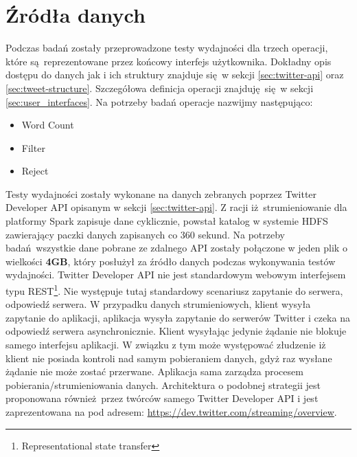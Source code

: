 \section{Źródła danych}
Podczas badań zostały przeprowadzone testy wydajności dla trzech operacji, które są reprezentowane przez końcowy interfejs użytkownika. Dokładny opis dostępu do danych jak i ich struktury znajduje się w sekcji \ref{sec:twitter-api} oraz \ref{sec:tweet-structure}. Szczegółowa definicja operacji znajduję się w sekcji \ref{sec:user_interfaces}. 
Na potrzeby badań operacje nazwijmy następująco:
\begin{itemize}
	\item {Word Count}
	\item {Filter}
	\item {Reject}
\end{itemize}
Testy wydajności zostały wykonane na danych zebranych poprzez Twitter Developer API opisanym w sekcji \ref{sec:twitter-api}. Z racji iż strumieniowanie dla platformy Spark zapisuje dane cyklicznie, powstał katalog w systemie HDFS zawierający paczki danych zapisanych co 360 sekund. Na potrzeby badań wszystkie dane pobrane ze zdalnego API zostały połączone w jeden plik o wielkości \textbf{4GB}, który posłużył za źródło danych podczas wykonywania testów wydajności. Twitter Developer API nie jest standardowym webowym interfejsem typu REST\footnote{Representational state transfer}. Nie występuje tutaj standardowy scenariusz zapytanie do serwera, odpowiedź serwera. W przypadku danych strumieniowych, klient wysyła zapytanie do aplikacji, aplikacja wysyła zapytanie do serwerów Twitter i czeka na odpowiedź serwera asynchronicznie. Klient wysyłając jedynie żądanie nie blokuje samego interfejsu aplikacji. W związku z tym może występować złudzenie iż klient nie posiada kontroli nad samym pobieraniem danych, gdyż raz wysłane żądanie nie może zostać przerwane. Aplikacja sama zarządza procesem pobierania/strumieniowania danych. Architektura o podobnej strategii jest proponowana również przez twórców samego Twitter Developer API i jest zaprezentowana na pod adresem: \url{https://dev.twitter.com/streaming/overview}.
